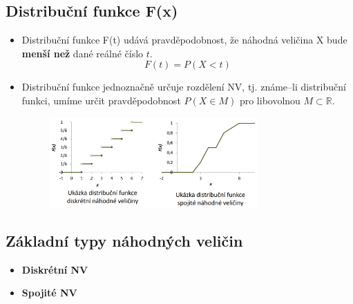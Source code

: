 \subsection{Distribuční funkce F(x)}
\begin{itemize}
	\item Distribuční funkce F(t) udává pravděpodobnost, že náhodná veličina X bude \textbf{menší než} dané reálné číslo $t$. 
	$$F(t) = P(X <t)$$
	\item Distribuční funkce jednoznačně určuje rozdělení NV, tj. známe--li distribuční funkci, umíme určit pravděpodobnost $P(X \in M)$ pro libovolnou $M\subset \mathbb{R}$.
	\begin{figure}[H]
	\centering
	\includegraphics[width=0.75\textwidth]{assets/11_dist_fce}
	\end{figure}
\end{itemize}

\subsection{Základní typy náhodných veličin}
\begin{itemize}
	\item \textbf{Diskrétní NV} 
	\item \textbf{Spojité NV} 
\end{itemize}

